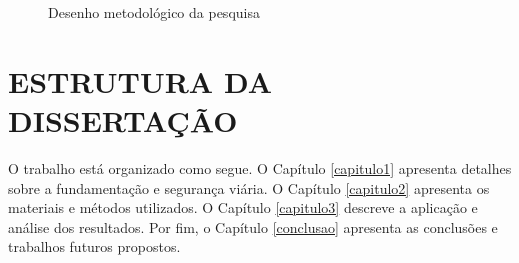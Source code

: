 \begin{figure}[htbp]
\centering
\caption{Desenho metodológico da pesquisa}
\label{fig:desenho_metodologico}
\end{figure}

\section{ESTRUTURA DA DISSERTAÇÃO}

O trabalho está organizado como segue. O Capítulo \ref{capitulo1} apresenta detalhes sobre a fundamentação e segurança viária. O Capítulo \ref{capitulo2} apresenta os materiais e métodos utilizados. O Capítulo \ref{capitulo3} descreve a aplicação e análise dos resultados. Por fim, o Capítulo \ref{conclusao} apresenta as conclusões e trabalhos futuros propostos.